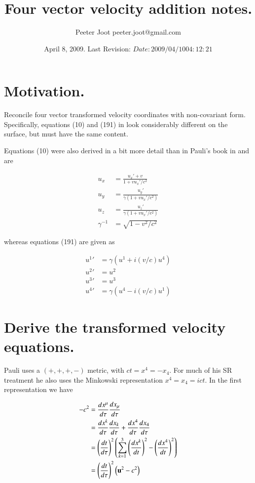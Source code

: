 \documentclass{article}
\title{ Four vector velocity addition notes. }
\author{Peeter Joot \quad peeter.joot@gmail.com }
\date{ April 8, 2009.  Last Revision: $Date: 2009/04/10 04:12:21 $ }
\begin{document}
\maketitle{}
\tableofcontents
\section{ Motivation. }

Reconcile four vector transformed velocity coordinates with non-covariant form.
Specifically, equations (10) and (191) in \cite{pauli1981tr} look considerably
different on the surface, but must have the same content.

Equations (10) were also derived in a bit more detail than in Pauli's book in
\cite{PJpauliVelocityAddition} and are

\begin{align}\label{eqn:eqn10}
u_x &= \frac{ {u_x}' + v  }{ 1 + v {u_x}'/c^2} \\
u_y &= \frac{{u_y}'}{\gamma (1 + v {u_x}'/c^2)} \\
u_z &= \frac{{u_z}'}{\gamma (1 + v {u_x}'/c^2)} \\
\gamma^{-1} &= \sqrt{ 1 - v^2/c^2}
\end{align}

whereas equations (191) are given as

\begin{align}\label{eqn:eqn191}
{u^1}' &= \gamma ( u^1 + i (v/c) u^4) \\
{u^2}' &= {u^2} \\
{u^3}' &= {u^3} \\
{u^4}' &= \gamma ( u^4 - i (v/c) u^1)
\end{align}

\section{ Derive the transformed velocity equations. }

Pauli uses a $(+,+,+,-)$ metric, with $ct = x^4 = - x_4$.  For much of his SR treatment he also uses the Minkowski representation $x^4 = x_4 = ict$. In the first representation we have

\begin{align*}
-c^2 
&= \frac{dx^\mu}{d\tau} \frac{dx_\mu}{d\tau} \\
&= \frac{dx^k}{d\tau} \frac{dx_k}{d\tau} + \frac{dx^4}{d\tau} \frac{dx_4}{d\tau} \\
&= \left(\frac{dt}{d\tau}\right)^2 \left( \sum_{k=1}^3 \left(\frac{dx^k}{dt}\right)^2 - \left(\frac{dx^4}{dt}\right)^2 \right) \\
&= \left(\frac{dt}{d\tau}\right)^2 \left( \mathbf{u}^2 - c^2 \right) \\
\end{align*}
\end{document}

